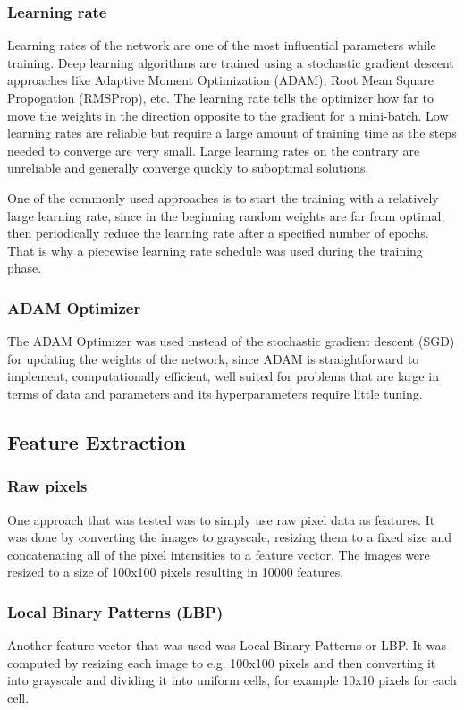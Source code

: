 \documentclass[doc/report.tex]{subfiles}
\begin{document}
\subsubsection{Learning rate}
Learning rates of the network are one of the most influential parameters while
training. Deep learning algorithms are trained using a stochastic gradient
descent approaches like Adaptive Moment Optimization (ADAM), Root Mean Square
Propogation (RMSProp), etc. The learning rate tells the optimizer how far to
move the weights in the direction opposite to the gradient for a mini-batch.
Low learning rates are reliable but require a large amount of training time as
the steps needed to converge are very small. Large learning rates on the
contrary are unreliable and generally converge quickly to suboptimal solutions.

One of the commonly used approaches is to start the training with a relatively
large learning rate, since in the beginning random weights are far from
optimal, then periodically reduce the learning rate after a specified number of
epochs. That is why a piecewise learning rate schedule was used during the
training phase.

\subsubsection{ADAM Optimizer}
The ADAM Optimizer was used instead of the stochastic gradient descent (SGD)
for updating the weights of the network, since ADAM is straightforward to
implement, computationally efficient, well suited for problems that are large
in terms of data and parameters and its hyperparameters require little tuning.

\subsection{Feature Extraction}

\subsubsection{Raw pixels}
One approach that was tested was to simply use raw pixel data as features. It
was done by converting the images to grayscale, resizing them to a fixed size
and concatenating all of the pixel intensities to a feature vector. The images
were resized to a size of 100x100 pixels resulting in 10000 features.

\subsubsection{Local Binary Patterns (LBP)}
Another feature vector that was used was Local Binary Patterns or LBP. It was
computed by resizing each image to e.g. 100x100 pixels and then converting it
into grayscale and dividing it into uniform cells, for example 10x10 pixels for
each cell.
\end{document}

